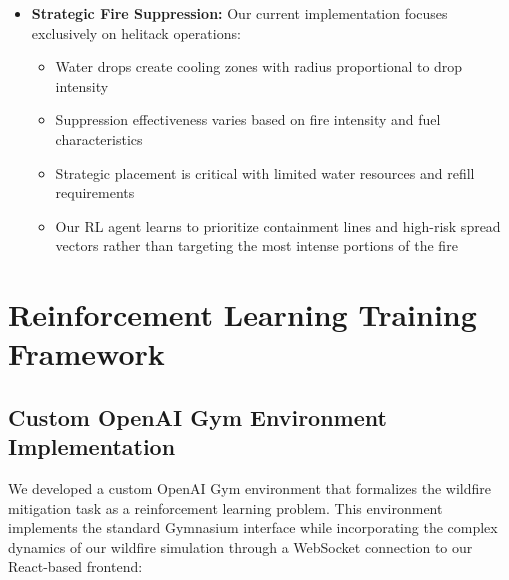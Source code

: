 \documentclass[conference]{IEEEtran}
\begin{document}
\begin{itemize}
    \item \textbf{Strategic Fire Suppression:} Our current implementation focuses exclusively on helitack operations:
    \begin{itemize}
        \item Water drops create cooling zones with radius proportional to drop intensity
        \item Suppression effectiveness varies based on fire intensity and fuel characteristics
        \item Strategic placement is critical with limited water resources and refill requirements
        \item Our RL agent learns to prioritize containment lines and high-risk spread vectors rather than targeting the most intense portions of the fire
    \end{itemize}
\end{itemize}

\section{Reinforcement Learning Training Framework}

\subsection{Custom OpenAI Gym Environment Implementation}

We developed a custom OpenAI Gym environment that formalizes the wildfire mitigation task as a reinforcement learning problem. This environment implements the standard Gymnasium interface while incorporating the complex dynamics of our wildfire simulation through a WebSocket connection to our React-based frontend:
\end{document}
